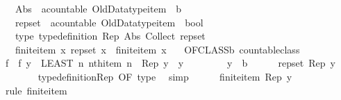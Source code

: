 \begin{isabellebody}
\ \ \ Abs\ {\isacharcolon}{\isacharcolon}\ {\isachardoublequoteopen}{\isacharparenleft}{\isacharprime}a{\isacharcolon}{\isacharcolon}countable{\isacharparenright}\ Old{\isacharunderscore}Datatype{\isachardot}item\ {\isasymRightarrow}\ {\isacharprime}b{\isachardoublequoteclose}\isanewline
\ \ \ rep{\isacharunderscore}set\ {\isacharcolon}{\isacharcolon}\ {\isachardoublequoteopen}{\isacharparenleft}{\isacharprime}a{\isacharcolon}{\isacharcolon}countable{\isacharparenright}\ Old{\isacharunderscore}Datatype{\isachardot}item\ {\isasymRightarrow}\ bool{\isachardoublequoteclose}\isanewline
\ \ \ type{\isacharcolon}\ {\isachardoublequoteopen}type{\isacharunderscore}definition\ Rep\ Abs\ {\isacharparenleft}Collect\ rep{\isacharunderscore}set{\isacharparenright}{\isachardoublequoteclose}\isanewline
\ \ \ finite{\isacharunderscore}item{\isacharcolon}\ {\isachardoublequoteopen}{\isasymAnd}x{\isachardot}\ rep{\isacharunderscore}set\ x\ {\isasymLongrightarrow}\ finite{\isacharunderscore}item\ x{\isachardoublequoteclose}\isanewline
\ \ \ {\isachardoublequoteopen}OFCLASS{\isacharparenleft}{\isacharprime}b{\isacharcomma}\ countable{\isacharunderscore}class{\isacharparenright}{\isachardoublequoteclose}\isanewline
%
\isadelimproof
%
\endisadelimproof
%
\isatagproof
{}\isamarkupfalse%
\isanewline
\ \ \isamarkupfalse%
\ f\ \ {\isachardoublequoteopen}f\ y\ {\isacharequal}\ {\isacharparenleft}LEAST\ n{\isachardot}\ nth{\isacharunderscore}item\ n\ {\isacharequal}\ Rep\ y{\isacharparenright}{\isachardoublequoteclose}\ \ y\isanewline
\ \ \isacommand{{\isacharbraceleft}}\isamarkupfalse%
\isanewline
\ \ \ \ \isamarkupfalse%
\ y\ {\isacharcolon}{\isacharcolon}\ {\isacharprime}b\isanewline
\ \ \ \ \isamarkupfalse%
\ {\isachardoublequoteopen}rep{\isacharunderscore}set\ {\isacharparenleft}Rep\ y{\isacharparenright}{\isachardoublequoteclose}\isanewline
\ \ \ \ \ \ \isamarkupfalse%
\ type{\isacharunderscore}definition{\isachardot}Rep\ {\isacharbrackleft}OF\ type{\isacharbrackright}\ \isamarkupfalse%
\ simp\isanewline
\ \ \ \ \isamarkupfalse%
\ {\isachardoublequoteopen}finite{\isacharunderscore}item\ {\isacharparenleft}Rep\ y{\isacharparenright}{\isachardoublequoteclose}\isanewline
\ \ \ \ \ \ \isamarkupfalse%
\ {\isacharparenleft}rule\ finite{\isacharunderscore}item{\isacharparenright}\isanewline
\ \ \ \ \isamarkupfalse%

\end{isabellebody}

